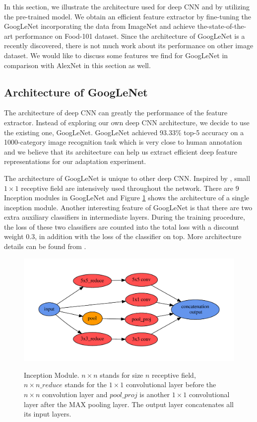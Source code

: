 ﻿In this section, we illustrate the architecture used for deep CNN and by utilizing the pre-trained model. We obtain an efficient feature extractor by fine-tuning the GoogLeNet incorporating the data from ImageNet and achieve the-state-of-the-art performance on Food-101 dataset. Since the architecture of GoogLeNet is a recently discovered, there is not much work about its performance on other image dataset. We would like to discuss some features we find for GoogLeNet in comparison with AlexNet\cite{krizhevsky2012imagenet} in this section as well.
\subsection{Architecture of GoogLeNet}
The architecture of deep CNN can greatly the performance of the feature extractor.
Instead of exploring our own deep CNN architecture, we decide to use the existing one, GoogLeNet. GoogLeNet achieved 93.33\% top-5 accuracy on a 1000-category image recognition task which is very close to human annotation and we believe that its architecture can help us extract efficient deep feature representations for our adaptation experiment.

 The architecture of GoogLeNet is unique to other deep CNN. Inspired by \cite{linNiN}, small $1\times 1$ receptive field are intensively used throughout the network. There are 9 Inception modules in GoogLeNet and Figure \ref{incept} shows the architecture of a single inception module. Another interesting feature of GoogLeNet is that there are two extra auxiliary classifiers in intermediate layers. During the training procedure, the loss of these two classifiers are counted into the total loss with a discount weight 0.3, in addition with the loss of the classifier on top. More architecture details can be found from \cite{szegedy2014going}.

\begin{figure}
  \centering
  \includegraphics[scale=.45]{fig/inception.pdf}\\
  \caption{Inception Module. $n\times n$ stands for size $n$ receptive field, $n\times n\_reduce$ stands for the $1\times 1$ convolutional layer before the $n\times n$ convolution layer and $pool\_proj$ is another $1\times 1$ convolutional layer after the MAX pooling layer. The output layer concatenates all its input layers.}\label{incept}
\end{figure}

